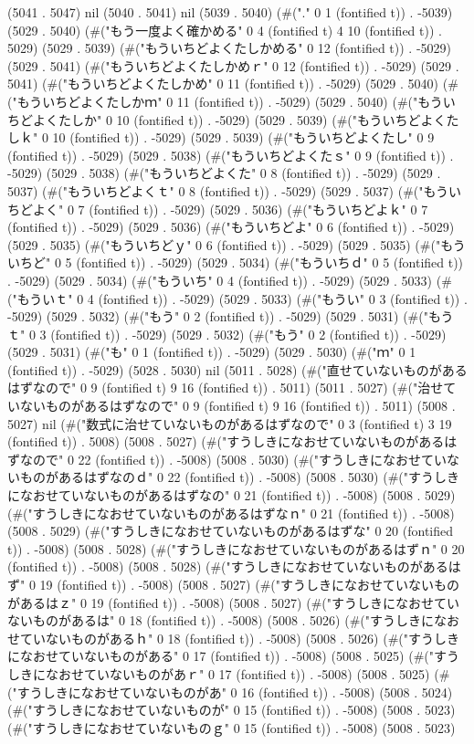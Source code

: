 (5041 . 5047) nil (5040 . 5041) nil (5039 . 5040) (#("." 0 1 (fontified t)) . -5039) (5029 . 5040) (#("もう一度よく確かめる" 0 4 (fontified t) 4 10 (fontified t)) . 5029) (5029 . 5039) (#("もういちどよくたしかめる" 0 12 (fontified t)) . -5029) (5029 . 5041) (#("もういちどよくたしかめｒ" 0 12 (fontified t)) . -5029) (5029 . 5041) (#("もういちどよくたしかめ" 0 11 (fontified t)) . -5029) (5029 . 5040) (#("もういちどよくたしかｍ" 0 11 (fontified t)) . -5029) (5029 . 5040) (#("もういちどよくたしか" 0 10 (fontified t)) . -5029) (5029 . 5039) (#("もういちどよくたしｋ" 0 10 (fontified t)) . -5029) (5029 . 5039) (#("もういちどよくたし" 0 9 (fontified t)) . -5029) (5029 . 5038) (#("もういちどよくたｓ" 0 9 (fontified t)) . -5029) (5029 . 5038) (#("もういちどよくた" 0 8 (fontified t)) . -5029) (5029 . 5037) (#("もういちどよくｔ" 0 8 (fontified t)) . -5029) (5029 . 5037) (#("もういちどよく" 0 7 (fontified t)) . -5029) (5029 . 5036) (#("もういちどよｋ" 0 7 (fontified t)) . -5029) (5029 . 5036) (#("もういちどよ" 0 6 (fontified t)) . -5029) (5029 . 5035) (#("もういちどｙ" 0 6 (fontified t)) . -5029) (5029 . 5035) (#("もういちど" 0 5 (fontified t)) . -5029) (5029 . 5034) (#("もういちｄ" 0 5 (fontified t)) . -5029) (5029 . 5034) (#("もういち" 0 4 (fontified t)) . -5029) (5029 . 5033) (#("もういｔ" 0 4 (fontified t)) . -5029) (5029 . 5033) (#("もうい" 0 3 (fontified t)) . -5029) (5029 . 5032) (#("もう" 0 2 (fontified t)) . -5029) (5029 . 5031) (#("もうｔ" 0 3 (fontified t)) . -5029) (5029 . 5032) (#("もう" 0 2 (fontified t)) . -5029) (5029 . 5031) (#("も" 0 1 (fontified t)) . -5029) (5029 . 5030) (#("ｍ" 0 1 (fontified t)) . -5029) (5028 . 5030) nil (5011 . 5028) (#("直せていないものがあるはずなので" 0 9 (fontified t) 9 16 (fontified t)) . 5011) (5011 . 5027) (#("治せていないものがあるはずなので" 0 9 (fontified t) 9 16 (fontified t)) . 5011) (5008 . 5027) nil (#("数式に治せていないものがあるはずなので" 0 3 (fontified t) 3 19 (fontified t)) . 5008) (5008 . 5027) (#("すうしきになおせていないものがあるはずなので" 0 22 (fontified t)) . -5008) (5008 . 5030) (#("すうしきになおせていないものがあるはずなのｄ" 0 22 (fontified t)) . -5008) (5008 . 5030) (#("すうしきになおせていないものがあるはずなの" 0 21 (fontified t)) . -5008) (5008 . 5029) (#("すうしきになおせていないものがあるはずなｎ" 0 21 (fontified t)) . -5008) (5008 . 5029) (#("すうしきになおせていないものがあるはずな" 0 20 (fontified t)) . -5008) (5008 . 5028) (#("すうしきになおせていないものがあるはずｎ" 0 20 (fontified t)) . -5008) (5008 . 5028) (#("すうしきになおせていないものがあるはず" 0 19 (fontified t)) . -5008) (5008 . 5027) (#("すうしきになおせていないものがあるはｚ" 0 19 (fontified t)) . -5008) (5008 . 5027) (#("すうしきになおせていないものがあるは" 0 18 (fontified t)) . -5008) (5008 . 5026) (#("すうしきになおせていないものがあるｈ" 0 18 (fontified t)) . -5008) (5008 . 5026) (#("すうしきになおせていないものがある" 0 17 (fontified t)) . -5008) (5008 . 5025) (#("すうしきになおせていないものがあｒ" 0 17 (fontified t)) . -5008) (5008 . 5025) (#("すうしきになおせていないものがあ" 0 16 (fontified t)) . -5008) (5008 . 5024) (#("すうしきになおせていないものが" 0 15 (fontified t)) . -5008) (5008 . 5023) (#("すうしきになおせていないものｇ" 0 15 (fontified t)) . -5008) (5008 . 5023) 